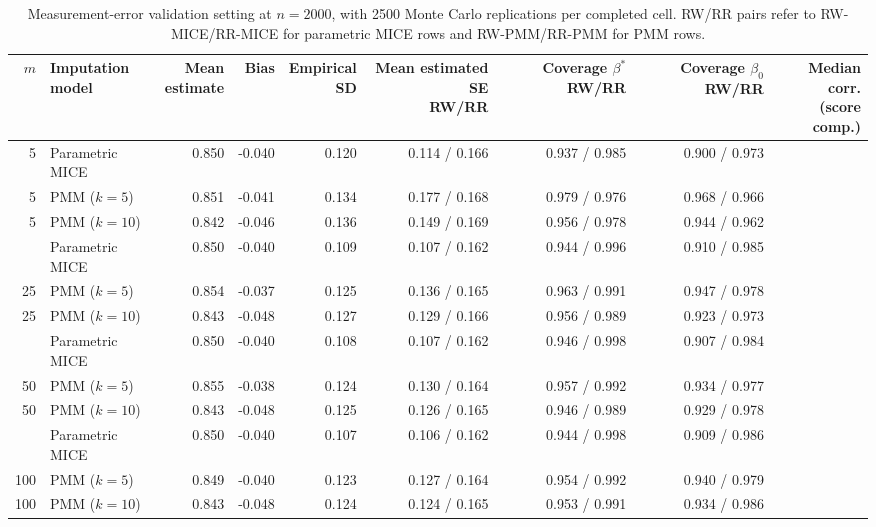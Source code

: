 \begin{table}[!htbp]
\centering
\scriptsize
\setlength{\tabcolsep}{2.5pt}
\begin{tabular}{rlrrrrrrr}
\toprule
\(m\) & \makecell{Imputation\\model} &
\makecell{Mean\\estimate} & Bias &
\makecell{Empirical\\SD} &
\makecell{Mean estimated SE\\RW/RR} &
\makecell{Coverage \(\beta^\ast\)\\RW/RR} &
\makecell{Coverage \(\beta_0\)\\RW/RR} & \makecell{Median corr.\\(score comp.)}\\
\midrule
5   & Parametric MICE & 0.850 & -0.040 & 0.120 & 0.114 / 0.166 & 0.937 / 0.985 & 0.900 / 0.973 &\\
5   & PMM (\(k=5\))  & 0.851 & -0.041 & 0.134 & 0.177 / 0.168 & 0.979 / 0.976 & 0.968 / 0.966 &\\
5   & PMM (\(k=10\)) & 0.842 & -0.046 & 0.136 & 0.149 / 0.169 & 0.956 / 0.978 & 0.944 / 0.962 &\\
\addlinespace[2pt]
25  & Parametric MICE & 0.850 & -0.040 & 0.109 & 0.107 / 0.162 & 0.944 / 0.996 & 0.910 / 0.985 &\\
25  & PMM (\(k=5\))  & 0.854 & -0.037 & 0.125 & 0.136 / 0.165 & 0.963 / 0.991 & 0.947 / 0.978 &\\
25  & PMM (\(k=10\)) & 0.843 & -0.048 & 0.127 & 0.129 / 0.166 & 0.956 / 0.989 & 0.923 / 0.973 &\\
\addlinespace[2pt]
50  & Parametric MICE & 0.850 & -0.040 & 0.108 & 0.107 / 0.162 & 0.946 / 0.998 & 0.907 / 0.984 &\\
50  & PMM (\(k=5\))  & 0.855 & -0.038 & 0.124 & 0.130 / 0.164 & 0.957 / 0.992 & 0.934 / 0.977 &\\
50  & PMM (\(k=10\)) & 0.843 & -0.048 & 0.125 & 0.126 / 0.165 & 0.946 / 0.989 & 0.929 / 0.978 &\\
\addlinespace[2pt]
100 & Parametric MICE & 0.850 & -0.040 & 0.107 & 0.106 / 0.162 & 0.944 / 0.998 & 0.909 / 0.986 &\\
100 & PMM (\(k=5\))  & 0.849 & -0.040 & 0.123 & 0.127 / 0.164 & 0.954 / 0.992 & 0.940 / 0.979 &\\
100 & PMM (\(k=10\)) & 0.843 & -0.048 & 0.124 & 0.124 / 0.165 & 0.953 / 0.991 & 0.934 / 0.986 &\\
\bottomrule
\end{tabular}
\caption{Measurement-error validation setting at \(n=2000\), with 2500
Monte Carlo replications per completed cell.  RW/RR pairs refer
to RW-MICE/RR-MICE for parametric MICE rows and
RW-PMM/RR-PMM for PMM rows.}
\label{tab:gs-validation-n2000}
\end{table}

